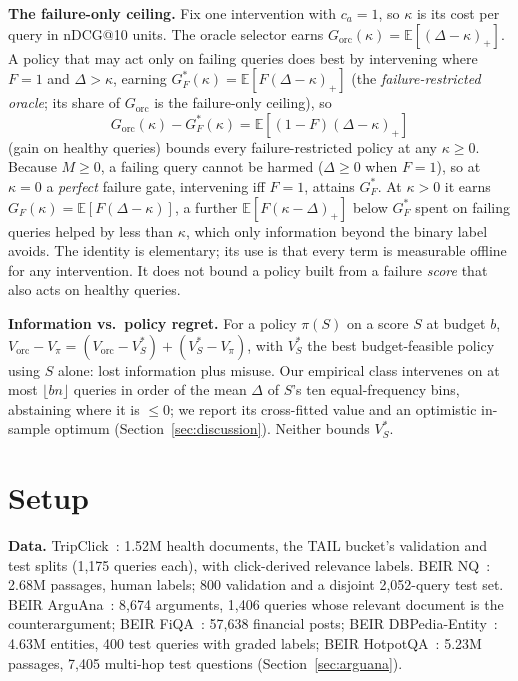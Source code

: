 \documentclass[sigconf,anonymous,review]{acmart}
\begin{document}
\textbf{The failure-only ceiling.} Fix one intervention with $c_a=1$,
so $\kappa$ is its cost per query in nDCG@10 units. The oracle selector earns
$G_{\text{orc}}(\kappa)=\mathbb{E}[(\Delta-\kappa)_+]$. A policy that
may act only on failing queries does best by intervening where $F=1$
and $\Delta>\kappa$, earning $G^*_{F}(\kappa)=\mathbb{E}[F(\Delta-\kappa)_+]$
(the \emph{failure-restricted oracle}; its share of $G_{\text{orc}}$ is
the failure-only ceiling), so
\[
G_{\text{orc}}(\kappa)-G^*_{F}(\kappa)
=\mathbb{E}[(1-F)(\Delta-\kappa)_+]
\]
(gain on healthy queries) bounds every failure-restricted policy at any
$\kappa\ge0$. Because $M\ge 0$, a failing query cannot be harmed
($\Delta\ge 0$ when $F=1$), so at $\kappa=0$ a \emph{perfect} failure
gate, intervening iff $F=1$, attains $G^*_F$. At $\kappa>0$ it earns
$G_F(\kappa)=\mathbb{E}[F(\Delta-\kappa)]$, a further
$\mathbb{E}[F(\kappa-\Delta)_+]$ below $G^*_F$ spent on failing queries
helped by less than $\kappa$, which only information beyond the binary
label avoids. The identity is elementary; its use is that every term is
measurable offline for any intervention. It does not bound a policy
built from a failure \emph{score} that also acts on healthy queries.

\textbf{Information vs.\ policy regret.} For a policy $\pi(S)$ on a
score $S$ at budget $b$, $V_{\text{orc}}-V_\pi=(V_{\text{orc}}-V_S^*)+(V_S^*-V_\pi)$,
with $V_S^*$ the best budget-feasible policy using $S$ alone: lost
information plus misuse. Our empirical class intervenes on at most
$\lfloor bn\rfloor$ queries in order of the mean $\Delta$ of $S$'s ten
equal-frequency bins, abstaining where it is $\le0$; we report its
cross-fitted value and an optimistic in-sample optimum
(Section~\ref{sec:discussion}). Neither bounds $V_S^*$.

\section{Setup}

\textbf{Data.} TripClick~\cite{tripclick}: 1.52M health documents, the
TAIL bucket's validation and test splits (1{,}175 queries each), with
click-derived relevance labels. BEIR NQ~\cite{beir,natural-questions}:
2.68M passages, human labels; 800 validation and a disjoint
2{,}052-query test set. BEIR ArguAna~\cite{arguana}: 8{,}674
arguments, 1{,}406 queries whose relevant document is the
counterargument; BEIR FiQA~\cite{fiqa}: 57{,}638 financial posts;
BEIR DBPedia-Entity~\cite{dbpedia-entity}: 4.63M entities, 400 test
queries with graded labels; BEIR HotpotQA~\cite{hotpotqa}: 5.23M
passages, 7{,}405 multi-hop test questions (Section~\ref{sec:arguana}).
\end{document}
